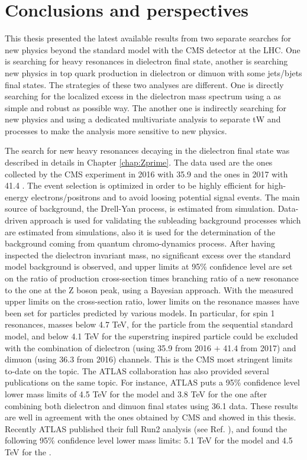 \chapter{Conclusions and perspectives}\label{chp:conclusion}


This thesis presented the latest available results from two separate searches for new physics beyond the standard model with the CMS detector at the LHC. One is searching for heavy resonances in dielectron final state, another is searching new physics in top quark production in dielectron or dimuon with some jets/bjets final states. The strategies of these two analyses are different. One is directly searching for the localized excess in the dielectron mass spectrum using a as simple and robust as possible way. The another one is indirectly searching for new physics and using a dedicated multivariate analysis to separate tW and \ttbar~ processes to make the analysis more sensitive to new physics.

The search for new heavy resonances decaying in the dielectron final state was described in details in Chapter \ref{chap:Zprime}. The data used are the ones collected by the CMS experiment in 2016 with 35.9 \fbinv and the ones in 2017 with 41.4 \fbinv. The event selection is optimized in order to be highly efficient for high-energy electrons/positrons and to avoid loosing potential signal events. The main source of background, the Drell-Yan process, is estimated from simulation. Data-driven approach is used for validating the subleading background processes which are estimated from simulations, also it is used for the determination of the background coming from quantum chromo-dynamics process. After having inspected the dielectron invariant mass, no significant excess over the standard model background is observed, and upper limits at 95\% confidence level are set on the ratio of production cross-section times branching ratio of a new resonance to the one at the Z boson peak, using a Bayesian approach. With the measured upper limits on the cross-section ratio, lower limits on the resonance masses have been set for particles predicted by various models. In particular, for spin 1 resonances, masses below 4.7 TeV, for the \ZPSSM particle from the sequential standard model, and below 4.1 TeV for the superstring inspired \ZPPSI particle could be excluded with the combination of dielectron (using 35.9 \fbinv from 2016 $+$ 41.4 \fbinv from 2017) and dimuon (using 36.3 \fbinv from 2016) channels. This is the CMS most stringent limits to-date on the topic. 
The ATLAS collaboration has also provided several publications on the same topic. For instance, ATLAS \cite{ATLAS-CONF-2017-027} puts a 95\% confidence level lower mass limits of 4.5 TeV for the \ZPSSM model and 3.8 TeV for the \ZPPSI one after combining both dielectron and dimuon final states using 36.1 \fbinv data. These results are well in agreement with the ones obtained by CMS and showed in this thesis. Recently ATLAS published their full Run2 analysis (see Ref. \cite{Aad:2019fac}), and found the following 95\% confidence level lower mass limits: 5.1 TeV for the \ZPSSM model and 4.5 TeV for the \ZPPSI.



